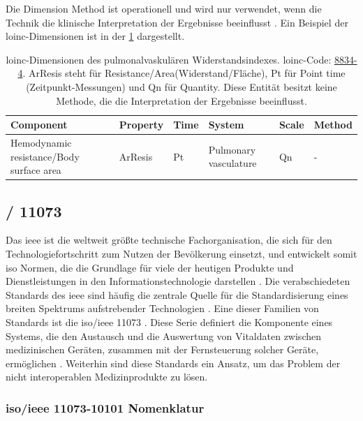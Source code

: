 Die Dimension \glqq Method\grqq{} ist operationell und wird nur verwendet, wenn die Technik die klinische Interpretation der Ergebnisse beeinflusst \cite{interop}. Ein Beispiel der \ac{loinc}-Dimensionen ist in der \ref{tab:loincdimensions} dargestellt.

\begin{table}[ht]
	\centering 
	\small 
	\caption[\acs{loinc}-Dimensionen]{\ac{loinc}-Dimensionen des pulmonalvaskulären Widerstandsindexes. \ac{loinc}-Code: \href{https://loinc.org/8834-4/}{8834-4}. ArResis steht für  Resistance/Area\grqq (Widerstand/Fläche), Pt für Point time (Zeitpunkt-Messungen) und Qn für Quantity. Diese Entität besitzt keine Methode, die die Interpretation der Ergebnisse beeinflusst.}
	\label{tab:loincdimensions}
	\begin{tabular}{|p{3cm}|l|l|p{2cm}|l|l|}
		\hline
		\bfseries Component & \bfseries Property & \bfseries Time & \bfseries System & \bfseries Scale & \bfseries Method \\ \hline
		Hemodynamic resistance/Body surface area & ArResis & Pt & Pulmonary vasculature & Qn & - \\ \hline	
	\end{tabular}
\end{table}

\subsection{/ 11073\texttrademark{}} \label{subsec:ieee}

Das \acf{ieee} ist die weltweit größte technische Fachorganisation, die sich für den Technologiefortschritt zum Nutzen der Bevölkerung einsetzt, und entwickelt somit \acf{iso} Normen, die die Grundlage für viele der heutigen Produkte und Dienstleistungen in den Informationstechnologie darstellen \cite{ieeeiso}. Die verabschiedeten Standards des \ac{ieee} sind häufig die zentrale Quelle für die Standardisierung eines breiten Spektrums aufstrebender Technologien \cite{ieeeglance}. Eine dieser Familien von Standards ist die \acs{iso}/\ac{ieee} 11073\texttrademark{} \cite{ieeeglance, ieeearch}. Diese Serie definiert die Komponente eines Systems, die den Austausch und die Auswertung von Vitaldaten zwischen medizinischen Geräten, zusammen mit der Fernsteuerung solcher Geräte, ermöglichen \cite{ieeearch}. Weiterhin sind diese Standards ein Ansatz, um das Problem der nicht interoperablen Medizinprodukte zu lösen. 

\subsubsection{\acs{iso}/\acs{ieee} 11073-10101\texttrademark{} Nomenklatur} \label{subsub:ieee1107310101}

